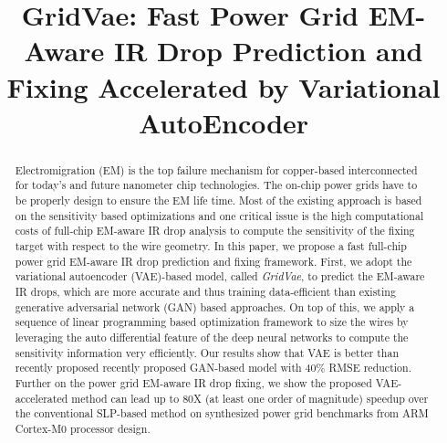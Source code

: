 \documentclass[journal]{IEEEtran}
\begin{document}
\title{GridVae: Fast Power Grid EM-Aware IR Drop Prediction and Fixing
  Accelerated by Variational AutoEncoder}



\maketitle
  
\begin{abstract}
  Electromigration (EM) is the top failure mechanism for copper-based
  interconnected for today's and future nanometer chip technologies.
  The on-chip power grids have to be properly design to ensure the EM
  life time. Most of the existing approach is based on the sensitivity
  based optimizations and one critical issue is the high computational
  costs of full-chip EM-aware IR drop analysis to compute the
  sensitivity of the fixing target with respect to the wire
  geometry. In this paper, we propose a fast full-chip power grid
  EM-aware IR drop prediction and fixing framework. First, we adopt
  the variational autoencoder (VAE)-based model, called {\it GridVae},
  to predict the EM-aware IR drops, which are more accurate and thus
  training data-efficient than existing generative adversarial network
  (GAN) based approaches. On top of this, we apply a sequence of
  linear programming based optimization framework to size the wires by
  leveraging the auto differential feature of the deep neural networks
  to compute the sensitivity information very efficiently.  Our
  results show that VAE is better than recently proposed recently
  proposed GAN-based model with
  40$\%$ RMSE reduction.  Further on the power grid EM-aware IR drop
  fixing, we show the proposed VAE-accelerated method can lead up to
  80X (at least one order of magnitude) speedup over the conventional
  SLP-based method on synthesized power grid benchmarks from ARM
  Cortex-M0 processor design.

\end{abstract}
 





\end{document}
